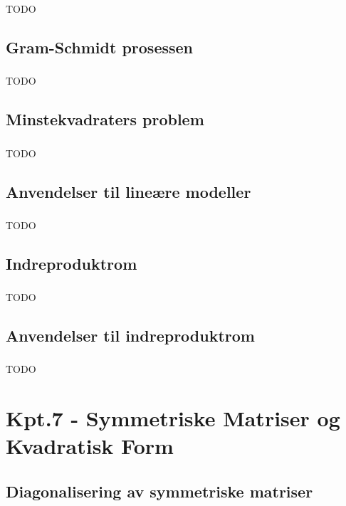 \documentclass{article}
\begin{document}
      \subsubsection{}
        TODO
    \subsection{Gram-Schmidt prosessen}
      \subsubsection{}
        TODO
    \subsection{Minstekvadraters problem}
      \subsubsection{}
        TODO
    \subsection{Anvendelser til lineære modeller}
      \subsubsection{}
        TODO
    \subsection{Indreproduktrom}
      \subsubsection{}
        TODO
    \subsection{Anvendelser til indreproduktrom}
      \subsubsection{}
        TODO
  \section{Kpt.7 - Symmetriske Matriser og Kvadratisk Form}
    \subsection{Diagonalisering av symmetriske matriser}
\end{document}
